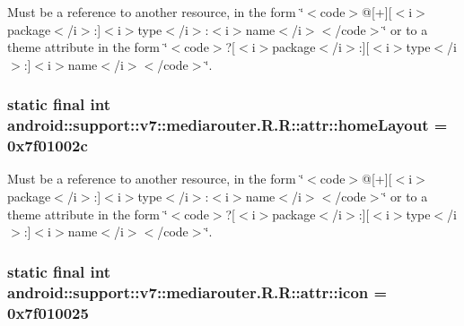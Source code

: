 Must be a reference to another resource, in the form \char`\"{}$<$code$>$@\mbox{[}+\mbox{]}\mbox{[}$<$i$>$package$<$/i$>$:\mbox{]}$<$i$>$type$<$/i$>$:$<$i$>$name$<$/i$>$$<$/code$>$\char`\"{} or to a theme attribute in the form \char`\"{}$<$code$>$?\mbox{[}$<$i$>$package$<$/i$>$:\mbox{]}\mbox{[}$<$i$>$type$<$/i$>$:\mbox{]}$<$i$>$name$<$/i$>$$<$/code$>$\char`\"{}. \hypertarget{classandroid_1_1support_1_1v7_1_1mediarouter_1_1_r_1_1attr_6878fc7dd59cff8e22071c8fa6dea8cc}{
\subsubsection[{homeLayout}]{\setlength{\rightskip}{0pt plus 5cm}static final int android::support::v7::mediarouter.R.R::attr::homeLayout = 0x7f01002c}}
\label{classandroid_1_1support_1_1v7_1_1mediarouter_1_1_r_1_1attr_6878fc7dd59cff8e22071c8fa6dea8cc}


Must be a reference to another resource, in the form \char`\"{}$<$code$>$@\mbox{[}+\mbox{]}\mbox{[}$<$i$>$package$<$/i$>$:\mbox{]}$<$i$>$type$<$/i$>$:$<$i$>$name$<$/i$>$$<$/code$>$\char`\"{} or to a theme attribute in the form \char`\"{}$<$code$>$?\mbox{[}$<$i$>$package$<$/i$>$:\mbox{]}\mbox{[}$<$i$>$type$<$/i$>$:\mbox{]}$<$i$>$name$<$/i$>$$<$/code$>$\char`\"{}. \hypertarget{classandroid_1_1support_1_1v7_1_1mediarouter_1_1_r_1_1attr_d41ffa4ee8138d53e76091be368ebc1c}{
\subsubsection[{icon}]{\setlength{\rightskip}{0pt plus 5cm}static final int android::support::v7::mediarouter.R.R::attr::icon = 0x7f010025}}
\label{classandroid_1_1support_1_1v7_1_1mediarouter_1_1_r_1_1attr_d41ffa4ee8138d53e76091be368ebc1c}


